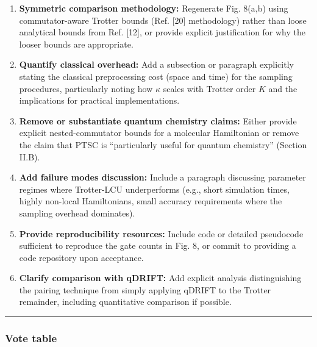 \documentclass[10pt,letterpaper]{article}
\begin{document}
\begin{enumerate}
\def\labelenumi{\arabic{enumi}.}
\item
  \textbf{Symmetric comparison methodology:} Regenerate Fig. 8(a,b) using commutator-aware Trotter bounds (Ref. {[}20{]} methodology) rather than loose analytical bounds from Ref. {[}12{]}, or provide explicit justification for why the looser bounds are appropriate.
\item
  \textbf{Quantify classical overhead:} Add a subsection or paragraph explicitly stating the classical preprocessing cost (space and time) for the sampling procedures, particularly noting how \(\kappa\) scales with Trotter order \(K\) and the implications for practical implementations.
\item
  \textbf{Remove or substantiate quantum chemistry claims:} Either provide explicit nested-commutator bounds for a molecular Hamiltonian or remove the claim that PTSC is ``particularly useful for quantum chemistry'' (Section II.B).
\item
  \textbf{Add failure modes discussion:} Include a paragraph discussing parameter regimes where Trotter-LCU underperforms (e.g., short simulation times, highly non-local Hamiltonians, small accuracy requirements where the sampling overhead dominates).
\item
  \textbf{Provide reproducibility resources:} Include code or detailed pseudocode sufficient to reproduce the gate counts in Fig. 8, or commit to providing a code repository upon acceptance.
\item
  \textbf{Clarify comparison with qDRIFT:} Add explicit analysis distinguishing the pairing technique from simply applying qDRIFT to the Trotter remainder, including quantitative comparison if possible.
\end{enumerate}

\begin{center}\rule{0.5\linewidth}{0.5pt}\end{center}

\hypertarget{vote-table}{%
\subsubsection{Vote table}\label{vote-table}}
\end{document}
